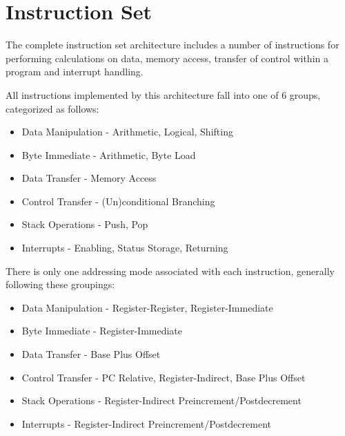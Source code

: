 
\newpage
\section{Instruction Set}

The complete instruction set architecture includes a number of instructions for performing calculations on data, memory access, transfer of control within a program and interrupt handling. 

\vspace{\baselineskip}
\noindent All instructions implemented by this architecture fall into one of 6 groups, categorized as follows:
\begin{itemize}
	\item Data Manipulation - Arithmetic, Logical, Shifting
	\item Byte Immediate - Arithmetic, Byte Load
	\item Data Transfer - Memory Access
	\item Control Transfer - (Un)conditional Branching
	\item Stack Operations - Push, Pop
	\item Interrupts - Enabling, Status Storage, Returning
\end{itemize}

\vspace{\baselineskip}
\noindent There is only one addressing mode associated with each instruction, generally following these groupings:
\begin{itemize}
	\item Data Manipulation - Register-Register, Register-Immediate
	\item Byte Immediate - Register-Immediate
	\item Data Transfer - Base Plus Offset
	\item Control Transfer - PC Relative, Register-Indirect, Base Plus Offset
	\item Stack Operations - Register-Indirect Preincrement/Postdecrement
	\item Interrupts - Register-Indirect Preincrement/Postdecrement
\end{itemize}
\vspace{\baselineskip}

